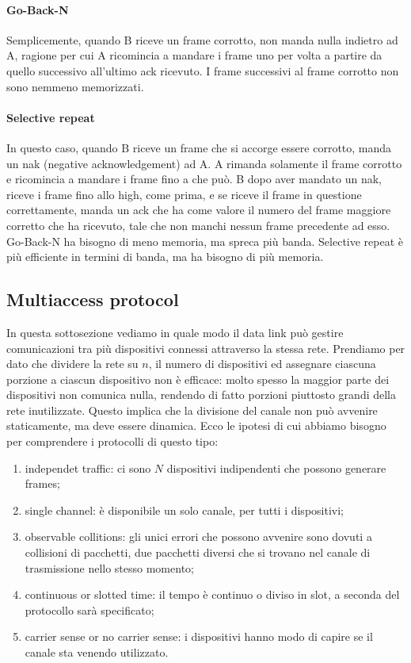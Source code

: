 \documentclass{article}
\begin{document}
\paragraph{Go-Back-N} Semplicemente, quando B riceve un frame corrotto, non manda nulla
indietro ad A, ragione per cui A ricomincia a mandare i frame uno per volta a
partire da quello successivo all'ultimo ack ricevuto. I frame successivi al
frame corrotto non sono nemmeno memorizzati.

\paragraph{Selective repeat} In questo caso, quando B riceve un frame che si
accorge essere corrotto, manda un nak (negative acknowledgement) ad A. A rimanda
solamente il frame corrotto e ricomincia a mandare i frame fino a che può. B
dopo aver mandato un nak, riceve i frame fino allo high, come prima, e se riceve
il frame in questione correttamente, manda un ack che ha come valore il numero
del frame maggiore corretto che ha ricevuto, tale che non manchi nessun frame
precedente ad esso.\\

Go-Back-N ha bisogno di meno memoria, ma spreca più banda. Selective repeat è
più efficiente in termini di banda, ma ha bisogno di più memoria.\\

\subsection{Multiaccess protocol}
In questa sottosezione vediamo in quale modo il data link può gestire
comunicazioni tra più dispositivi connessi attraverso la stessa rete. Prendiamo
per dato che dividere la rete su $n$, il numero di dispositivi ed assegnare
ciascuna porzione a ciascun dispositivo non è efficace: molto spesso la maggior
parte dei dispositivi non comunica nulla, rendendo di fatto porzioni piuttosto
grandi della rete inutilizzate. Questo implica che la divisione del canale non
può avvenire staticamente, ma deve essere dinamica. Ecco le ipotesi di cui
abbiamo bisogno per comprendere i protocolli di questo tipo:
\begin{enumerate}
	\item independet traffic: ci sono $N$ dispositivi indipendenti che possono
	      generare frames;

	\item single channel: è disponibile un solo canale, per tutti i dispositivi;

	\item observable collitions: gli unici errori che possono avvenire sono
	      dovuti a collisioni di pacchetti, due pacchetti diversi che si trovano
	      nel canale di trasmissione nello stesso momento;

	\item continuous or slotted time: il tempo è continuo o diviso in slot, a
	      seconda del protocollo sarà specificato;

	\item carrier sense or no carrier sense: i dispositivi hanno modo di capire
	      se il canale sta venendo utilizzato.
\end{enumerate}
\end{document}

